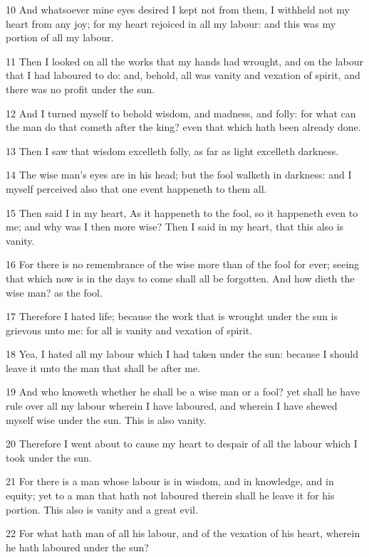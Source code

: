 \documentclass[12pt]{report}
\begin{document}
10 And whatsoever mine eyes desired I kept not from them, I
   withheld
   not my heart from any joy; for my heart rejoiced in all my labour:
   and
   this was my portion of all my labour.
   
11 Then I looked on all the works that my hands had wrought, and
   on
   the labour that I had laboured to do: and, behold, all was vanity
   and
   vexation of spirit, and there was no profit under the sun.
   
12 And I turned myself to behold wisdom, and madness, and folly:
   for
   what can the man do that cometh after the king? even that which
   hath
   been already done.
   
13 Then I saw that wisdom excelleth folly, as far as light
   excelleth
   darkness. 
   
14 The wise man's eyes are in his head; but the fool walketh in
   darkness: and I myself perceived also that one event happeneth to
   them
   all.
   
15 Then said I in my heart, As it happeneth to the fool, so it
   happeneth even to me; and why was I then more wise? Then I said in
   my
   heart, that this also is vanity.
   
16 For there is no remembrance of the wise more than of the fool
   for
   ever; seeing that which now is in the days to come shall all be
   forgotten. And how dieth the wise man? as the fool.
   
17 Therefore I hated life; because the work that is wrought under
   the sun is grievous unto me: for all is vanity and vexation of
   spirit.
   
18 Yea, I hated all my labour which I had taken under the sun:
   because I should leave it unto the man that shall be after me.
   
19 And who knoweth whether he shall be a wise man or a fool? yet
   shall he have rule over all my labour wherein I have laboured, and 
   wherein I have shewed myself wise under the sun. This is also
   vanity.
   
20 Therefore I went about to cause my heart to despair of all the
   labour which I took under the sun.
   
21 For there is a man whose labour is in wisdom, and in
   knowledge,  
   and in equity; yet to a man that hath not laboured therein shall he
   leave it for his portion. This also is vanity and a great evil.
   
22 For what hath man of all his labour, and of the vexation of
   his
   heart, wherein he hath laboured under the sun?
   
\end{document}
